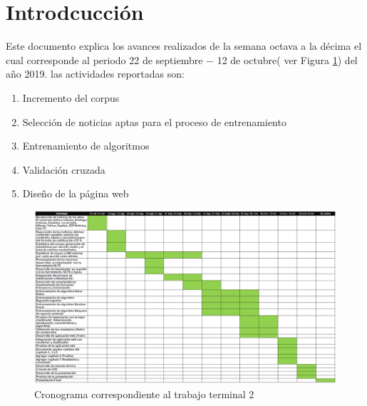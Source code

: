 \section{Introdcucción}

Este documento explica los avances realizados de la semana octava a  la décima el cual corresponde al periodo 22 de septiembre $-$ 12 de octubre( ver Figura \ref{fig:cronograma}) del año 2019. las actividades reportadas son:

\begin{enumerate}
	\item Incremento del corpus
	\item Selección de noticias aptas para el proceso de entrenamiento	
	\item Entrenamiento de algoritmos
	\item Validación cruzada
	\item Diseño de la página web
\end{enumerate} 

\begin{figure}[ht]
\centering
\includegraphics[scale=0.4]{imagenes/Cronograma.png}
\caption{Cronograma correspondiente al trabajo terminal 2}
\label{fig:cronograma}
\end{figure}

